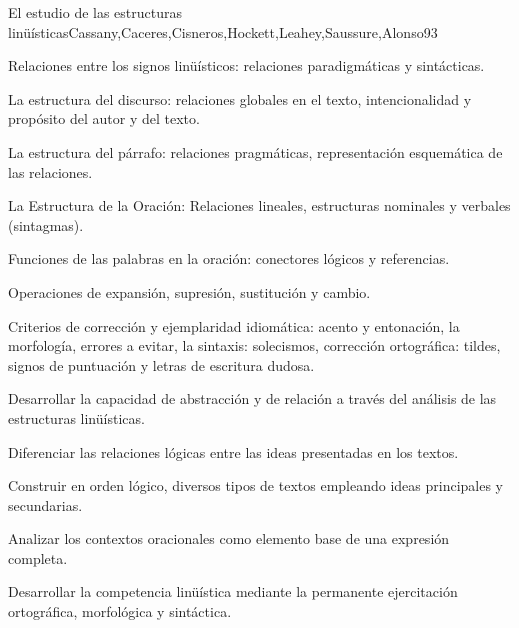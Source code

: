\begin{syllabus}
\begin{unit}{El estudio de las estructuras linüísticas}{Cassany,Caceres,Cisneros,Hockett,Leahey,Saussure,Alonso}{9}{3}
\begin{topics}
   \item Relaciones entre los signos linüísticos: relaciones paradigmáticas y sintácticas.
   \item La estructura del discurso: relaciones globales en el texto, intencionalidad y propósito del autor y del texto. 
   \item La estructura del párrafo: relaciones pragmáticas, representación esquemática de las relaciones. 
   \item La Estructura de la Oración: Relaciones lineales, estructuras nominales y verbales (sintagmas).
   \item Funciones de las palabras en la oración: conectores lógicos y referencias.
   \item Operaciones de expansión, supresión, sustitución y cambio.
   \item Criterios de corrección y ejemplaridad idiomática: acento y entonación, la morfología, errores a evitar, la sintaxis: solecismos, corrección ortográfica: tildes, signos de puntuación y letras de escritura dudosa.
\end{topics}

\begin{learningoutcomes}
   \item Desarrollar la capacidad de abstracción y de relación a través del análisis de las estructuras linüísticas.
   \item Diferenciar las relaciones lógicas entre las ideas presentadas en los textos.
   \item Construir en orden lógico, diversos tipos de textos empleando ideas principales y secundarias.
   \item Analizar los contextos oracionales como elemento base de una expresión completa.
   \item Desarrollar la competencia linüística mediante la permanente ejercitación ortográfica, morfológica y sintáctica.
\end{learningoutcomes}
\end{unit}


\end{syllabus}
